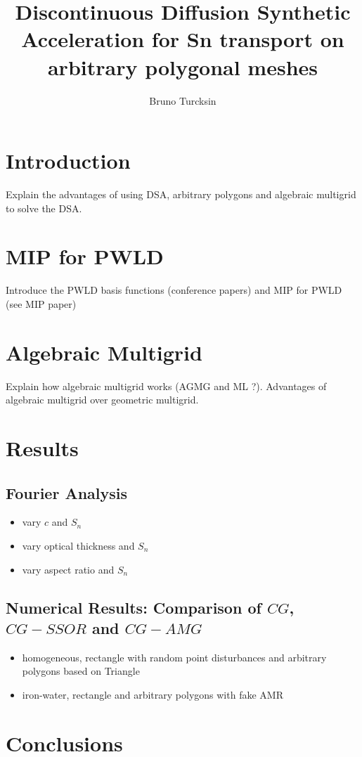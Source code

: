 \documentclass{article}
\renewcommand{\(}{\left(}
\renewcommand{\)}{\right)}
\renewcommand{\[}{\left[}
\renewcommand{\]}{\right]}
\begin{document}
\title{Discontinuous Diffusion Synthetic Acceleration for Sn transport on
arbitrary polygonal meshes}
\author{Bruno Turcksin} 
\date{}
\maketitle

\section{Introduction}
Explain the advantages of using DSA, arbitrary polygons and algebraic
multigrid to solve the DSA.

\section{MIP for PWLD}
Introduce the PWLD basis functions (conference papers) and MIP for PWLD (see
MIP paper)

\section{Algebraic Multigrid}
Explain how algebraic multigrid works (AGMG and ML ?). Advantages of algebraic
multigrid over geometric multigrid.

\section{Results}
\subsection{Fourier Analysis}
\begin{itemize}
\item vary $c$ and $S_n$
\item vary optical thickness and $S_n$
\item vary aspect ratio and $S_n$
\end{itemize}
\subsection{Numerical Results: Comparison of $CG$, $CG-SSOR$ and $CG-AMG$}
\begin{itemize}
\item homogeneous, rectangle with random point disturbances and arbitrary
polygons based on Triangle
\item iron-water, rectangle and arbitrary polygons with fake AMR
\end{itemize}

\section{Conclusions}
\end{document}
